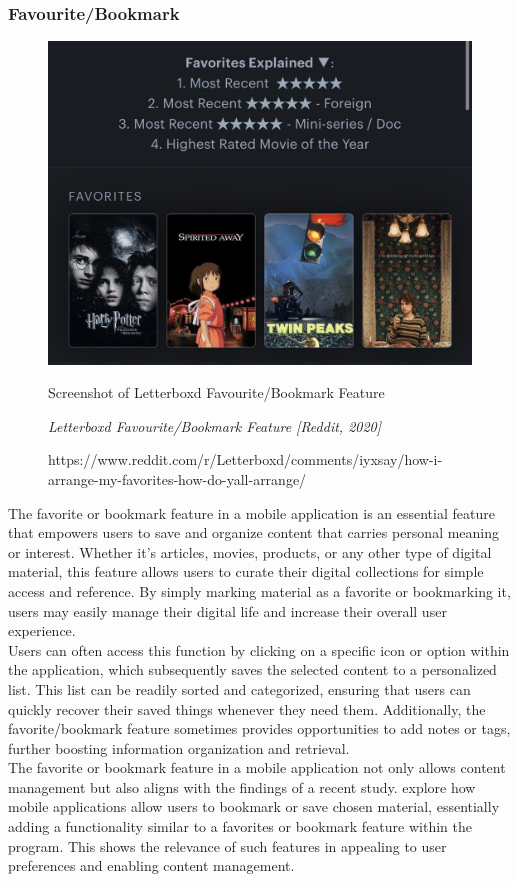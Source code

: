 \subsubsection{Favourite/Bookmark}
\begin{figure}[h]
    \centering
    \includegraphics[width=0.8\linewidth]{mainmatter/images/favbookmark.jpg}
    \caption{Screenshot of Letterboxd Favourite/Bookmark Feature}
    \caption*{\textit{Letterboxd Favourite/Bookmark Feature [Reddit, 2020]}}
    \caption*{https://www.reddit.com/r/Letterboxd/comments/iyxsay/how-i-arrange-my-favorites-how-do-yall-arrange/}
    \label{fig:myfig12}
\end{figure}
The favorite or bookmark feature in a mobile application is an essential feature that empowers users to save and organize content that carries personal meaning or interest. Whether it's articles, movies, products, or any other type of digital material, this feature allows users to curate their digital collections for simple access and reference. By simply marking material as a favorite or bookmarking it, users may easily manage their digital life and increase their overall user experience. \\

Users can often access this function by clicking on a specific icon or option within the application, which subsequently saves the selected content to a personalized list. This list can be readily sorted and categorized, ensuring that users can quickly recover their saved things whenever they need them. Additionally, the favorite/bookmark feature sometimes provides opportunities to add notes or tags, further boosting information organization and retrieval. \\

The favorite or bookmark feature in a mobile application not only allows content management but also aligns with the findings of a recent study. \textcite{abdulrahman22} explore how mobile applications allow users to bookmark or save chosen material, essentially adding a functionality similar to a favorites or bookmark feature within the program. This shows the relevance of such features in appealing to user preferences and enabling content management. \\

